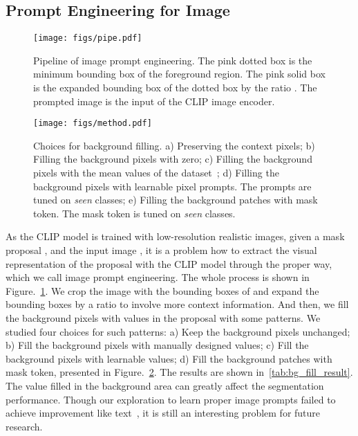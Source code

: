\documentclass[runningheads]{llncs}
\begin{document}
\subsection{Prompt Engineering for Image}

\begin{figure}[t]
  \centering
  \texttt{[image: figs/pipe.pdf]}
  \caption{Pipeline of image prompt engineering. The pink dotted box is the minimum bounding box of the foreground region. The pink solid box is the expanded bounding box of the dotted box by the ratio . The prompted image is the input of the CLIP image encoder.}
   \label{fig:pipe}
\end{figure}
\begin{figure}[t]
  \centering
  \texttt{[image: figs/method.pdf]}
  \caption{Choices for background filling. a) Preserving the context pixels; b) Filling the background pixels with zero; c) Filling the background pixels with the mean values of the dataset~\cite{radford2021learning}; d) Filling the background pixels with learnable pixel prompts. The prompts are tuned on \emph{seen} classes; e) Filling the background patches with mask token. The mask token is tuned on \emph{seen} classes.}
   \label{fig:bgfill}
\end{figure}

As the CLIP model is trained with low-resolution realistic images, given a mask proposal , and the input image , it is a problem how to extract the visual representation of the proposal with the CLIP model through the proper way, which we call image prompt engineering. The whole process is shown in Figure.~\ref{fig:pipe}. We crop the image with the bounding boxes of  and expand the bounding boxes by a ratio  to involve more context information. And then, we fill the background pixels with  values in the proposal with some patterns. We studied four choices for such patterns: a) Keep the background pixels unchanged; b) Fill the background pixels with manually designed values; c) Fill the background pixels with learnable values; d) Fill the background patches with mask token, presented in Figure.~\ref{fig:bgfill}. The results are shown in~\cref{tab:bg_fill_result}. The value filled in the background area can greatly affect the segmentation performance. 
Though our exploration to learn proper image prompts failed to achieve improvement like text~\cite{liu2021pre,zhou2021learning}, it is still an interesting problem for future research.
\end{document}
